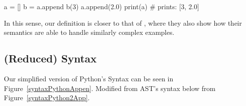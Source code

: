 \begin{pythoncode}
a = []
b = a.append
b(3)
a.append(2.0)
print(a)  # prints: [3, 2.0]
\end{pythoncode}

In this sense, our definition is closer to that of \textcite{politz_python_2013}, where
they also show how their semantics are able to handle similarly complex examples.

\subsection{(Reduced) Syntax}\label{reduced-syntax}

Our simplified version of Python's Syntax can be seen in Figure~\ref{syntaxPythonAppen}.
Modified from AST's syntax below from Figure~\ref{syntaxPython2App}.


